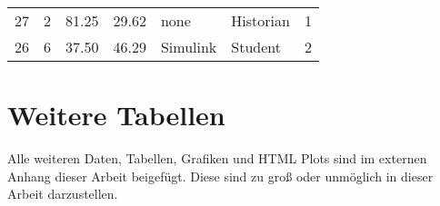 \begin{longtable}{rrrrllr}
        27    & 2                   & 81.25 & 29.62 & none      & Historian           & 1                                                                                                                                                                                                                                      \\
        26    & 6                   & 37.50 & 46.29 & Simulink  & Student             & 2                                                                                                                                                                                                                                      \\
\end{longtable}





\section{Weitere Tabellen}
Alle weiteren Daten, Tabellen, Grafiken und HTML Plots sind im externen Anhang dieser Arbeit beigefügt. Diese sind zu groß oder unmöglich in dieser Arbeit darzustellen.





